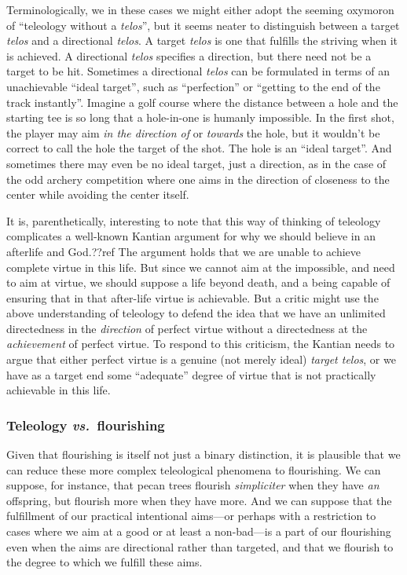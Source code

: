 Terminologically, we in these cases we might either adopt the seeming oxymoron of ``teleology without a \textit{telos}'', but it seems neater to distinguish between a target \textit{telos} and a directional \textit{telos}. A target \textit{telos} is
one that fulfills the striving when it is achieved. A directional \textit{telos} specifies a direction, but there need
not be a target to be hit. Sometimes a directional \textit{telos} can be formulated in terms of an unachievable 
``ideal target'', such as ``perfection'' or ``getting to the end of the track instantly''.  Imagine a golf course 
where the distance between a hole and the starting tee is so long that  a hole-in-one is humanly impossible. In the
first shot, the player may aim \textit{in the direction of} or \textit{towards} the hole, but it wouldn't be correct
to call the hole the target of the shot. The hole is an ``ideal target''. And sometimes there may even be no ideal target, just a direction, as in the case of the odd archery competition where one aims in the direction of closeness to the 
center while avoiding the center itself. 

It is, parenthetically, interesting to note that this way of thinking of teleology complicates a well-known 
Kantian argument for why we should believe in 
an afterlife and God.??ref The argument holds that we are unable to achieve complete virtue in this life. But since we cannot aim at
the impossible, and need to aim at virtue, we should suppose a life beyond death, and a being capable of ensuring that in that after-life virtue
is achievable. But a critic might use the above understanding of teleology to defend the idea that we have an unlimited 
directedness in the \textit{direction} of perfect virtue without a directedness at the \textit{achievement} of perfect virtue. To respond to this criticism, the Kantian needs to  argue that either perfect virtue is a genuine (not merely 
ideal) \textit{target telos}, or we have as a target end some ``adequate'' degree of virtue that is not
practically achievable in this life.

\subsubsection{Teleology \textit{vs.}\ flourishing}
Given that flourishing is itself not just a binary distinction, it is plausible that we can reduce these more
complex teleological phenomena to flourishing. We can suppose, for instance, that pecan trees flourish 
\textit{simpliciter} when they have \textit{an} offspring, but flourish more when they have more. And we can
suppose that the fulfillment of our practical intentional aims---or perhaps with a restriction to
cases where we aim at a good or at least a non-bad---is a part of our flourishing even when the aims are
directional rather than targeted, and that we flourish to the degree to which we fulfill these aims. 

